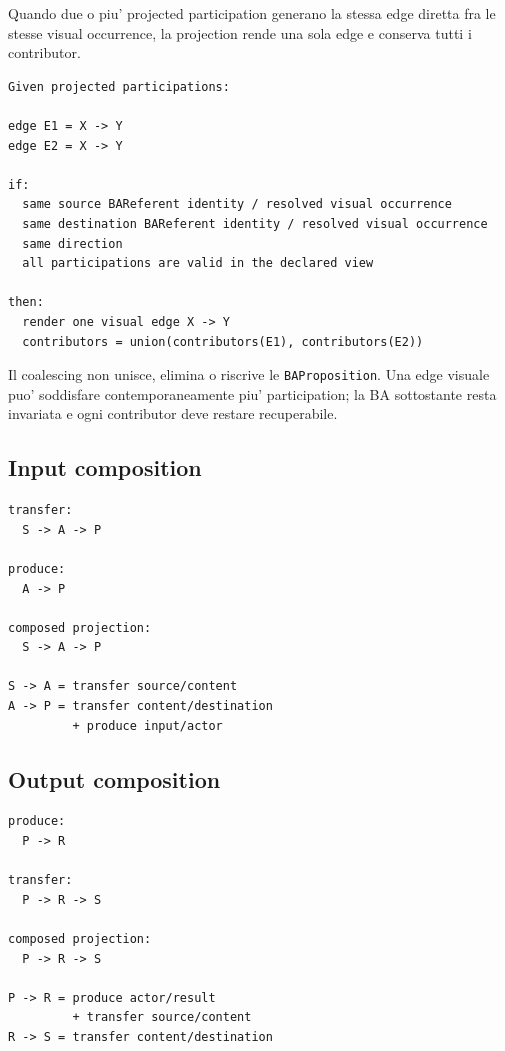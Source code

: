 \documentclass[11pt,a4paper]{article}
\newcommand{\BAP}{\texttt{BAProposition}}
\begin{document}
Quando due o piu' projected participation generano la stessa edge diretta fra le stesse visual occurrence, la projection rende una sola edge e conserva tutti i contributor.

\begin{lstlisting}
Given projected participations:

edge E1 = X -> Y
edge E2 = X -> Y

if:
  same source BAReferent identity / resolved visual occurrence
  same destination BAReferent identity / resolved visual occurrence
  same direction
  all participations are valid in the declared view

then:
  render one visual edge X -> Y
  contributors = union(contributors(E1), contributors(E2))
\end{lstlisting}

\begin{ddtaanti}[title={Non e' deduplicazione della BA}]
Il coalescing non unisce, elimina o riscrive le \BAP{}. Una edge visuale puo' soddisfare contemporaneamente piu' participation; la BA sottostante resta invariata e ogni contributor deve restare recuperabile.
\end{ddtaanti}

\subsection{Input composition}

\begin{lstlisting}
transfer:
  S -> A -> P

produce:
  A -> P

composed projection:
  S -> A -> P

S -> A = transfer source/content
A -> P = transfer content/destination
         + produce input/actor
\end{lstlisting}

\subsection{Output composition}

\begin{lstlisting}
produce:
  P -> R

transfer:
  P -> R -> S

composed projection:
  P -> R -> S

P -> R = produce actor/result
         + transfer source/content
R -> S = transfer content/destination
\end{lstlisting}
\end{document}

